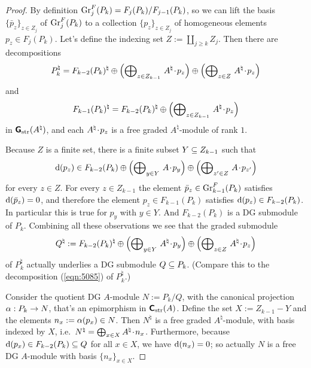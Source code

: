 \begin{proof}
By definition 
$\operatorname{Gr}^F_{j}(P_k) = F_{j}(P_k) / F_{j - 1}(P_k)$,
so we can lift the basis 
$\{ \bar{p}_z \}_{z \in Z_j}$ of $\operatorname{Gr}^F_{j}(P_k)$ to 
a collection $\{ p_z \}_{z \in Z_j}$ of homogeneous elements 
$p_z \in F_{j}(P_k)$. 
Let's define the indexing set $Z := \coprod_{j \geq k} Z_j$.
Then there are decompositions
\begin{equation} \label{eqn:5085}
P^{\natural}_k = F_{k - 2}(P_k)^{\natural} \oplus
\Bigl( \bigoplus\nolimits_{z \in Z_{k - 1}} \, A^{\natural} \mspace{1.5mu}{\cdot}\mspace{1.5mu} p_z \Bigr) 
\oplus 
\Bigl( \bigoplus\nolimits_{z \in Z} \, A^{\natural} \mspace{1.5mu}{\cdot}\mspace{1.5mu} p_z \Bigr) 
\end{equation}
and 
\[ F_{k - 1}(P_k)^{\natural} = F_{k - 2}(P_k)^{\natural} \oplus 
\Bigl( \bigoplus\nolimits_{z \in Z_{k - 1}} \, A^{\natural} \mspace{1.5mu}{\cdot}\mspace{1.5mu} p_z \Bigr)   \]
in $\boldsymbol{\mathsf{G}}_{\mathrm{str}}(A^{\natural})$, and each $A^{\natural} \mspace{1.5mu}{\cdot}\mspace{1.5mu} p_z$ is a 
free graded $A^{\natural}$-module of rank $1$. 

Because $Z$ is a finite set, there is a finite subset $Y \subseteq Z_{k - 1}$ such 
that 
\[ \mathrm{d}(p_z) \in F_{k - 2}(P_k) \oplus
\Bigl( \bigoplus\nolimits_{y \in Y} \, A \mspace{1.5mu}{\cdot}\mspace{1.5mu} p_y \Bigr) \oplus 
\Bigl( \bigoplus\nolimits_{z' \in Z} \, A \mspace{1.5mu}{\cdot}\mspace{1.5mu} p_{z'} \Bigr) \]
for every $z \in Z$. 
For every $z \in Z_{k - 1}$ the element 
$\bar{p}_z \in \operatorname{Gr}^F_{k - 1}(P_k)$ satisfies 
$\mathrm{d}(\bar{p}_z) = 0$, and therefore the element 
$p_z \in F_{k - 1}(P_k)$ satisfies $\mathrm{d}(p_z) \in F_{k - 2}(P_k)$.
In particular this is true for $p_y$ with $y \in Y$. 
And $F_{k - 2}(P_k)$ is a DG submodule of $P_k$.
Combining all these observations we see that the graded submodule
\begin{equation} \label{eqn:5086}
Q^{\natural} := F_{k - 2}(P_k)^{\natural} \oplus
\Bigl( \bigoplus\nolimits_{y \in Y} \, A^{\natural} \mspace{1.5mu}{\cdot}\mspace{1.5mu} p_y \Bigr) \oplus 
\Bigl( \bigoplus\nolimits_{z \in Z} \, A^{\natural} \mspace{1.5mu}{\cdot}\mspace{1.5mu} p_z \Bigr) 
\end{equation}
of $P_k^{\natural}$ actually underlies a DG submodule $Q \subseteq P_k$. 
(Compare this to the decomposition (\ref{eqn:5085}) of $P_k^{\natural}$.)

Consider the quotient DG $A$-module $N := P_k / Q$,
with the canonical projection $\alpha: P_k \to N$, that's an epimorphism in 
$\boldsymbol{\mathsf{C}}_{\mathrm{str}}(A)$. 
Define the set $X := Z_{k - 1} - Y$
and the elements 
$n_x := \alpha(p_x) \in N$. 
Then $N^{\natural}$ is a free graded $A^{\natural}$-module, with basis 
indexed by $X$, i.e.\ 
$N^{\natural} = \bigoplus\nolimits_{x \in X} A^{\natural} \mspace{1.5mu}{\cdot}\mspace{1.5mu} n_x$.
Furthermore, because 
$\mathrm{d}(p_x) \in F_{k - 2}(P_k) \subseteq Q$
for all $x \in X$, we have $\mathrm{d}(n_x) = 0$;
so actually $N$ is a free DG $A$-module with basis $\{ n_x \}_{x \in 
X}$. 


\end{proof}
